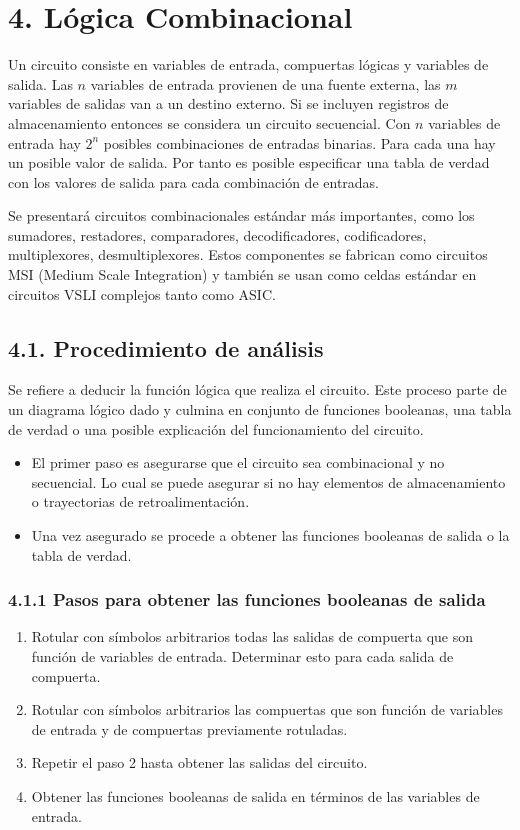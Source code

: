 \newpage
\section*{4. L\'{o}gica Combinacional}
Un circuito consiste en variables de entrada, compuertas l\'{o}gicas y
variables de salida. Las $n$ variables de entrada provienen de una fuente externa,
las $m$ variables de salidas van a un destino externo. Si se incluyen registros de
almacenamiento entonces se considera un circuito secuencial.
Con $n$ variables de entrada hay $2^n$ posibles combinaciones de entradas binarias.
Para cada una hay un posible valor de salida. Por tanto es posible especificar una
tabla de verdad con los valores de salida para cada combinaci\'{o}n de entradas.

Se presentar\'{a} circuitos combinacionales est\'{a}ndar m\'{a}s importantes, como
los sumadores, restadores, comparadores, decodificadores, codificadores, multiplexores,
desmultiplexores.
Estos componentes se fabrican como circuitos MSI (Medium Scale Integration) y tambi\'{e}n
se usan como celdas est\'{a}ndar en circuitos VSLI complejos tanto como ASIC.

\subsection*{4.1. Procedimiento de an\'{a}lisis}
Se refiere a deducir la funci\'{o}n l\'{o}gica que realiza el circuito. Este proceso
parte de un diagrama l\'{o}gico dado y culmina en conjunto de funciones booleanas, una
tabla de verdad o una posible explicaci\'{o}n del funcionamiento del circuito.
\medbreak

\begin{itemize}
    \item
          El primer paso es asegurarse que el circuito sea combinacional y no secuencial. Lo cual
          se puede asegurar si no hay elementos de almacenamiento o trayectorias de retroalimentaci\'{o}n.
    \item
          Una vez asegurado se procede a obtener las funciones booleanas de salida o la tabla de verdad.
\end{itemize}

\subsubsection*{4.1.1 Pasos para obtener las funciones booleanas de salida}
\begin{enumerate}
    \item Rotular con s\'{i}mbolos arbitrarios todas las salidas de compuerta que son
          funci\'{o}n de variables de entrada. Determinar esto para cada salida de compuerta.
    \item Rotular con s\'{i}mbolos arbitrarios las compuertas que son funci\'{o}n de
          variables de entrada y de compuertas previamente rotuladas.
    \item Repetir el paso 2 hasta obtener las salidas del circuito.
    \item Obtener las funciones booleanas de salida en t\'{e}rminos de las variables de entrada.
\end{enumerate}

